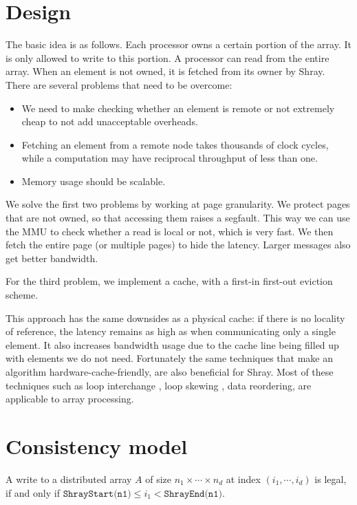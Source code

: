 \documentclass{article}
\begin{document}
\section{Design}

The basic idea is as follows. Each processor owns a certain portion of the array. It is only
allowed to write to this portion. A processor can read from the entire array. When an element
is not owned, it is fetched from its owner by Shray. There are several problems that need 
to be overcome:

\begin{itemize}
    \item We need to make checking whether an element is remote or not extremely cheap to 
          not add unacceptable overheads.
    \item Fetching an element from a remote node takes thousands of clock cycles, 
          while a computation may have reciprocal throughput of less than one. 
    \item Memory usage should be scalable.
\end{itemize}

We solve the first two problems by working at page granularity. We protect pages that are 
not owned, so that accessing them raises a segfault. This way we can use the MMU to check 
whether a read is local or not, which is very fast. We then fetch the entire page (or multiple 
pages) to hide the latency. Larger messages also get better bandwidth. 

For the third problem, we implement a cache, with a first-in first-out eviction scheme. 

\medskip

This approach has the same downsides as a physical cache: if there is no locality of reference,
the latency remains as high as when communicating only a single element. It also increases 
bandwidth usage due to the cache line being filled up with elements we do not need. 
Fortunately the same techniques that make an algorithm hardware-cache-friendly, are also 
beneficial for Shray. Most of these techniques such as loop interchange \cite{Allen84}, loop skewing
\cite{Wolfe89}, data reordering, are applicable to array processing.

\section{Consistency model}\label{consistency}

A write to a distributed array $A$ of size $n_1 \times \cdots \times n_d$ at index 
$(i_1, \cdots, i_d)$ is legal, if and only if 
$\texttt{ShrayStart(n1)} \leq i_1 < \texttt{ShrayEnd(n1)}$.
\end{document}
